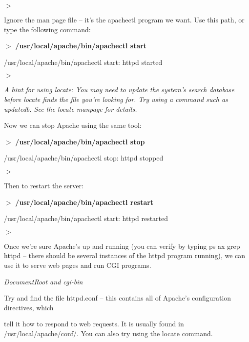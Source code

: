 \documentclass[a4paper,11pt]{book}
\begin{document}
\noindent $>$

\noindent 

\noindent Ignore  the man page file --  it's  the  apachectl program  we  want.  Use  this  path,  or  type  the following command:

\noindent 

\noindent $>$ \textbf{/usr/local/apache/bin/apachectl start}

\noindent /usr/local/apache/bin/apachectl start: httpd started

\noindent $>$

\noindent 

\noindent \textit{A hint for using locate: You may need to update the system's search database before locate finds the file you're looking for. Try using a command such as updatedb. See the locate manpage for details.}

\noindent 

\noindent 

\noindent Now we can stop Apache using the same tool:

\noindent 

\noindent $>$ \textbf{/usr/local/apache/bin/apachectl stop}

\noindent /usr/local/apache/bin/apachectl stop: httpd stopped

\noindent $>$

\noindent 

\noindent Then to restart the server:

\noindent 

\noindent $>$ \textbf{/usr/local/apache/bin/apachectl restart}

\noindent /usr/local/apache/bin/apachectl start: httpd restarted

\noindent $>$

\noindent 

\noindent Once we're sure Apache's up and running (you can verify by typing ps ax \textbar  grep httpd -- there should be several instances of the httpd program running), we can use it to serve web pages and run CGI programs.

\noindent 

\noindent \textit{DocumentRoot and cgi-bin}

\noindent Try and find the file httpd.conf --  this  contains  all  of  Apache's  configuration  directives,  which

\noindent tell  it  how  to  respond to  web requests.  It  is usually found  in  /usr/local/apache/conf/.  You  can also  try using the locate command.
\end{document}
